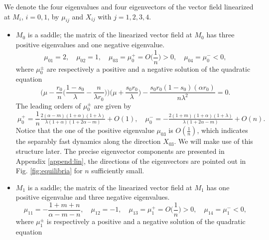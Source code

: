 \documentclass[usletter,11pt]{article}
\def\BO{{{O}}}
\theoremstyle{remark}
\begin{document}
We denote the four eigenvalues and four eigenvectors of the vector field linearized at $M_i$, $i=0,1$,  by $\mu_{ij}$ and $X_{ij}$ with $j=1,2,3,4$. 
\begin{itemize}
 \item $M_0$ is a saddle; the matrix of the linearized vector field at $M_0$ has three positive eigenvalues and one negative eigenvalue. 
 \begin{equation} \label{eq:eigM0}
  \mu_{01} = 2, \quad \mu_{02}=1, \quad \mu_{03}=\mu_0^+=\BO\Big(\frac{1}{n}\Big)>0, \quad \mu_{04}=\mu_0^{-}<0,
 \end{equation}
where $\mu_0^\pm$ are respectively a positive and a negative solution of the quadratic equation
 $$ 
 \Big(\mu - \frac{r_0}{n}\Big(\frac{1-s_0}{\lambda}-\frac{n}{\lambda r_0}\Big)\Big)\Big(\mu + \frac{s_0r_0}{\lambda}\Big) -
 \frac{s_0r_0(1-s_0)(\alpha r_0)}{n\lambda^2} = 0.
 $$
The leading orders of $\mu_0^\pm$ are given by
$$\
\mu_0^+ = \frac{1}{n} \tfrac{2(\alpha-m)(1+\alpha)(1+\lambda)}{\lambda(1+\alpha)(1+2\alpha-m)}+\BO(1), \quad
\mu_0^- = -\tfrac{2(1+m)(1+\alpha)(1+\lambda)}{\lambda(1+2\alpha-m)}  + \BO(n).$$
Notice that the one of the positive eigenvalue $\mu_{03}$ is $\BO( \frac{1}{n})$, which indicates the separably fast dynamics along the direction $X_{03}$. We will make use of this structure later.
The precise eigenvector components are presented in Appendix \ref{append:lin}, the directions of the eigenvectors are
pointed out in Fig. \ref{fig:equilibria} for $n$ sufficiently small.
 \item $M_1$ is a saddle;  the matrix of the linearized vector field at $M_1$ has one positive eigenvalue and three negative eigenvalues. 
\begin{equation} \label{eq:eigM1}
 \mu_{11}=-\frac{1+m+n}{\alpha-m-n}, \quad \mu_{12}=-1, \quad \mu_{13}=\mu_1^+=\BO\Big(\frac{1}{n}\Big)>0, \quad \mu_{14}=\mu_1^{-}<0,
\end{equation}
where $\mu_1^\pm$ is respectively a positive and a negative solution of the quadratic equation

\end{itemize}
\end{document}
